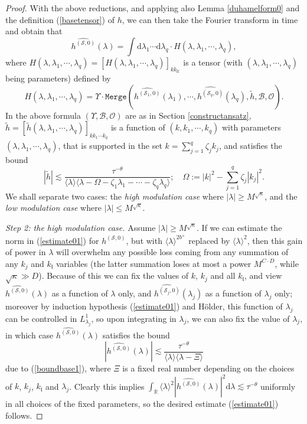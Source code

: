 \documentclass[11 pt,reqno]{amsart}
\theoremstyle{definition}
\theoremstyle{remark}
\numberwithin{equation}{section}
\newcommand{\Sc}{\mathcal{S}}
\newcommand{\Uc}{\mathcal{U}}
\newcommand{\Rb}{\mathbb{R}}
\newcommand{\lf}{\mathfrak{l}}
\newcommand{\Bs}{\mathscr{B}}
\newcommand{\Os}{\mathscr{O}}
\begin{document}
{\begin{proof}
With the above reductions, and applying also Lemma \ref{duhamelform0} and the definition (\ref{basetensor}) of $h$, we can then take the Fourier transform in time and obtain that
\begin{equation}\label{fourierexpand}
\widehat{h^{(\Sc,0)}}(\lambda)=\int\mathrm{d}\lambda_1\cdots\mathrm{d}\lambda_q\cdot H(\lambda,\lambda_1,\cdots,\lambda_q),
\end{equation} where $H(\lambda,\lambda_1,\cdots,\lambda_q)=[H(\lambda,\lambda_1,\cdots,\lambda_q)]_{kk_\Uc}$ is a tensor (with $(\lambda,\lambda_1,\cdots,\lambda_q)$ being parameters) defined by
\begin{equation}\label{fourierexpand2}H(\lambda,\lambda_1,\cdots,\lambda_q)=\Upsilon\cdot\mathtt{Merge}(\widehat{h^{(\Sc_1,0)}}(\lambda_1),\cdots,\widehat{h^{(\Sc_q,0)}}(\lambda_q),\widetilde{h},\Bs,\Os).
\end{equation} In the above formula $(\Upsilon,\Bs,\Os)$ are as in Section \ref{constructansatz}, $\widetilde{h}=[\widetilde{h}(\lambda,\lambda_1,\cdots,\lambda_q)]_{kk_1\cdots k_q}$ is a function of $(k,k_1,\cdots,k_q)$ with parameters $(\lambda,\lambda_1,\cdots,\lambda_q)$, that is supported in the set $k=\sum_{j=1}^q\zeta_jk_j$, and satisfies the bound
\begin{equation}\label{boundbase1}|\widetilde{h}|\lesssim\frac{\tau^{-\theta}}{\langle\lambda\rangle\langle\lambda-\Omega-\zeta_1\lambda_1-\cdots-\zeta_q\lambda_q\rangle};\quad \Omega:=|k|^2-\sum_{j=1}^q\zeta_j|k_j|^2.
\end{equation} We shall separate two cases: the \emph{high modulation case} where $|\lambda|\geq M^{\sqrt{\kappa}}$, and the \emph{low modulation case} where $|\lambda|\leq M^{\sqrt{\kappa}}$.

\emph{Step 2: the high modulation case.} Assume $|\lambda|\geq M^{\sqrt{\kappa}}$. If we can estimate the norm in (\ref{estimate01}) for $h^{(\Sc,0)}$, but with $\langle\lambda\rangle^{2b^+}$ replaced by $\langle\lambda\rangle^{2}$, then this gain of power in $\lambda$ will overwhelm any possible loss coming from any summation of any $k_j$ and $k_\lf$ variables (the latter summation loses at most a power $M^{C\cdot D}$, while $\sqrt{\kappa}\gg D$). Because of this we can fix the values of $k$, $k_j$ and all $k_\lf$, and view $\widehat{h^{(\Sc,0)}}(\lambda)$ as a function of $\lambda$ only, and $\widehat{h^{(\Sc_j,0)}}(\lambda_j)$ as a function of $\lambda_j$ only; moreover by induction hypothesis (\ref{estimate01}) and H\"{o}lder, this function of $\lambda_j$ can be controlled in $L_{\lambda_j}^1$, so upon integrating in $\lambda_j$, we can also fix the value of $\lambda_j$, in which case $\widehat{h^{(\Sc,0)}}(\lambda)$ satisfies the bound
\[|\widehat{h^{(\Sc,0)}}(\lambda)|\lesssim\frac{\tau^{-\theta}}{\langle\lambda\rangle\langle\lambda-\Xi\rangle}\] due to (\ref{boundbase1}), where $\Xi$ is a fixed real number depending on the choices of $k$, $k_j$, $k_\lf$ and $\lambda_j$. Clearly this implies $\int_\Rb \langle \lambda\rangle^2|\widehat{h^{(\Sc,0)}}(\lambda)|^2\mathrm{d}\lambda\lesssim \tau^{-\theta}$ uniformly in all choices of the fixed parameters, so the desired estimate (\ref{estimate01}) follows.


\end{proof}}
\end{document}
